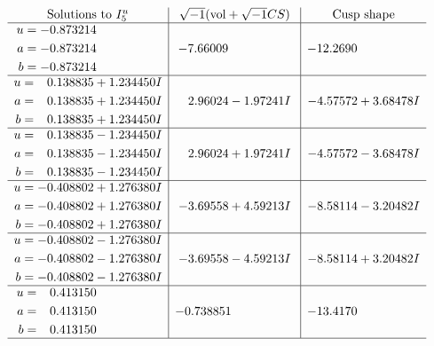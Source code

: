 \documentclass[1p]{elsarticle_modified}
\theoremstyle{definition}
\newcommand{\I}{\sqrt{-1}}
\begin{document}
$$\begin{array}{c|c|c}  
\text{Solutions to }I^u_{5}& \I (\text{vol} + \sqrt{-1}CS) & \text{Cusp shape}\\
 \hline 
\begin{aligned}
u &= -0.873214\phantom{ +0.000000I} \\
a &= -0.873214\phantom{ +0.000000I} \\
b &= -0.873214\phantom{ +0.000000I}\end{aligned}
 & -7.66009\phantom{ +0.000000I} & -12.2690\phantom{ +0.000000I} \\ \hline\begin{aligned}
u &= \phantom{-}0.138835 + 1.234450 I \\
a &= \phantom{-}0.138835 + 1.234450 I \\
b &= \phantom{-}0.138835 + 1.234450 I\end{aligned}
 & \phantom{-}2.96024 - 1.97241 I & -4.57572 + 3.68478 I \\ \hline\begin{aligned}
u &= \phantom{-}0.138835 - 1.234450 I \\
a &= \phantom{-}0.138835 - 1.234450 I \\
b &= \phantom{-}0.138835 - 1.234450 I\end{aligned}
 & \phantom{-}2.96024 + 1.97241 I & -4.57572 - 3.68478 I \\ \hline\begin{aligned}
u &= -0.408802 + 1.276380 I \\
a &= -0.408802 + 1.276380 I \\
b &= -0.408802 + 1.276380 I\end{aligned}
 & -3.69558 + 4.59213 I & -8.58114 - 3.20482 I \\ \hline\begin{aligned}
u &= -0.408802 - 1.276380 I \\
a &= -0.408802 - 1.276380 I \\
b &= -0.408802 - 1.276380 I\end{aligned}
 & -3.69558 - 4.59213 I & -8.58114 + 3.20482 I \\ \hline\begin{aligned}
u &= \phantom{-}0.413150\phantom{ +0.000000I} \\
a &= \phantom{-}0.413150\phantom{ +0.000000I} \\
b &= \phantom{-}0.413150\phantom{ +0.000000I}\end{aligned}
 & -0.738851\phantom{ +0.000000I} & -13.4170\phantom{ +0.000000I}\\
 \hline 
 \end{array}$$\newpage\newpage\renewcommand{\arraystretch}{1}
\end{document}
